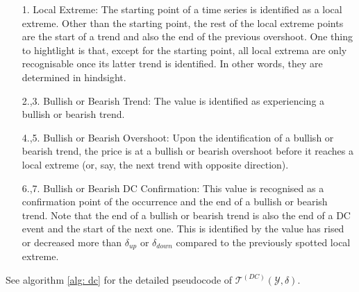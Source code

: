 \begin{enumerate}
    \item[1.] Local Extreme: The starting point of a time series is identified as a local extreme. Other than the starting point, the rest of the local extreme points are the start of a trend and also the end of the previous overshoot. One thing to hightlight is that, except for the starting point, all local extrema are only recognisable once its latter trend is identified. In other words, they are determined in hindsight.
    \item[2.,3.] Bullish or Bearish Trend: The value is identified as experiencing a bullish or bearish trend.
    \item[4.,5.] Bullish or Bearish Overshoot: Upon the identification of a bullish or bearish trend, the price is at a bullish or bearish overshoot before it reaches a local extreme (or, say, the next trend with opposite direction).
    \item[6.,7.] Bullish or Bearish DC Confirmation: This value is recognised as a confirmation point of the occurrence and the end of a bullish or bearish trend. Note that the end of a bullish or bearish trend is also the end of a DC event and the start of the next one. This is identified by the value has rised or decreased more than $\delta_{up}$ or $\delta_{down}$ compared to the previously spotted local extreme.
\end{enumerate}
See algorithm \ref{alg: dc} for the detailed pseudocode of $\mathcal{T}^{(DC)} (\mathcal{Y}, \delta)$.
